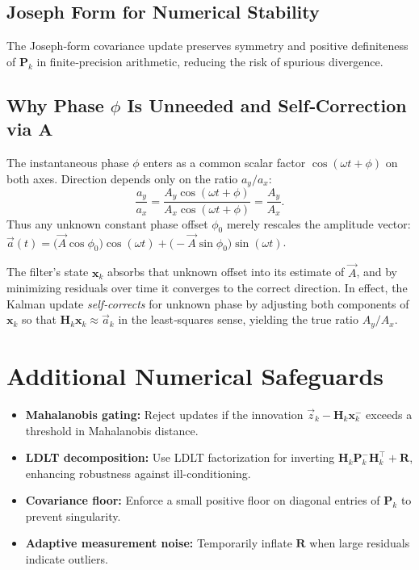 \documentclass[11pt,letterpaper]{article}
\begin{document}
\subsection{Joseph Form for Numerical Stability}
The Joseph‐form covariance update preserves symmetry and positive definiteness of \(\bm{P}_k\) in finite‐precision arithmetic, reducing the risk of spurious divergence.

\subsection{Why Phase $\phi$ Is Unneeded and Self‐Correction via $\bm{A}$}
The instantaneous phase $\phi$ enters as a common scalar factor \(\cos(\omega t+\phi)\) on both axes.  Direction depends only on the ratio \(a_y/a_x\):
\[
\frac{a_y}{a_x}
= \frac{A_y\cos(\omega t+\phi)}{A_x\cos(\omega t+\phi)}
= \frac{A_y}{A_x}.
\]
Thus any unknown constant phase offset $\phi_0$ merely rescales the amplitude vector: 
$\vec{a}(t)=\bigl(\vec{A}\cos\phi_0\bigr)\cos(\omega t)+\bigl(-\vec{A}\sin\phi_0\bigr)\sin(\omega t)$.

The filter’s state \(\bm{x}_k\) absorbs that unknown offset into its estimate of \(\vec{A}\), and by minimizing residuals over time it converges to the correct direction.  In effect, the Kalman update \emph{self‐corrects} for unknown phase by adjusting both components of \(\bm{x}_k\) so that \(\bm{H}_k\bm{x}_k\approx\vec{a}_k\) in the least‐squares sense, yielding the true ratio \(A_y/A_x\).

\section{Additional Numerical Safeguards}
\begin{itemize}
  \item \textbf{Mahalanobis gating:} Reject updates if the innovation \(\vec{z}_k - \bm{H}_k\bm{x}_k^-\) exceeds a threshold in Mahalanobis distance.
  \item \textbf{LDLT decomposition:} Use LDLT factorization for inverting \(\bm{H}_k\bm{P}_k^-\bm{H}_k^\top + \bm{R}\), enhancing robustness against ill-conditioning.
  \item \textbf{Covariance floor:} Enforce a small positive floor on diagonal entries of \(\bm{P}_k\) to prevent singularity.
  \item \textbf{Adaptive measurement noise:} Temporarily inflate \(\bm{R}\) when large residuals indicate outliers.
\end{itemize}
\end{document}
